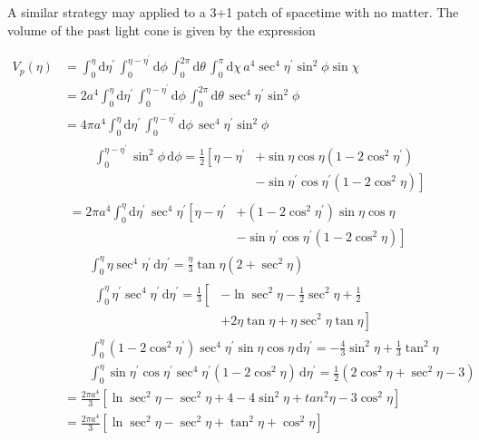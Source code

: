 \documentclass[preprint,notitlepage,amsmath,amssymb,floatfix]{revtex4-1}
\begin{document}
\noindent A similar strategy may applied to a 3+1 patch of spacetime with no matter.  The volume of the past light cone is given by the expression

\begin{align}
V_p\left(\eta\right) &= \int_0^\eta \! \mathrm d\eta^\prime \, \int_0^{\eta-\eta^\prime} \! \mathrm d\phi \, \int_0^{2\pi}\!\mathrm d\theta\, \int_0^\pi\!\mathrm d\chi\, a^4\sec^4\eta^\prime\sin^2\phi\sin\chi \\
  &= 2a^4\int_0^\eta\!\mathrm d\eta^\prime\, \int_0^{\eta-\eta^\prime}\!\mathrm d\phi\, \int_0^{2\pi}\!\mathrm d\theta\, \sec^4\eta^\prime\sin^2\phi \\
  &= 4\pi a^4 \int_0^\eta\!\mathrm d\eta^\prime\,\int_0^{\eta-\eta^\prime}\!\mathrm d\phi\, \sec^4\eta^\prime\sin^2\phi \\
  &\qquad\begin{aligned}
    \int_0^{\eta-\eta^\prime}\!\sin^2\phi\,\mathrm d\phi = \frac{1}{2}\left[\eta-\eta^\prime\right.&\left.+\sin\eta\cos\eta\left(1-2\cos^2\eta^\prime\right)\right. \\
    &\left.-\sin\eta^\prime\cos\eta^\prime\left(1-2\cos^2\eta\right)\right]
  \end{aligned} \\
  &\begin{aligned}
    = 2\pi a^4\int_0^\eta\!\mathrm d\eta^\prime\,\sec^4\eta^\prime\left[\eta-\eta^\prime\right.&\left.+\left(1-2\cos^2\eta^\prime\right)\sin\eta\cos\eta\right. \\
    &\left.-\sin\eta^\prime\cos\eta^\prime\left(1-2\cos^2\eta\right)\right]
  \end{aligned} \\
  &\qquad\int_0^\eta\!\eta\sec^4\eta^\prime\,\mathrm d\eta^\prime = \frac{\eta}{3}\tan\eta\left(2+\sec^2\eta\right) \\
  &\qquad\begin{aligned}
    \int_0^\eta\!\eta^\prime\sec^4\eta^\prime\,\mathrm d\eta^\prime = \frac{1}{3}\left[\right.&\left.-\ln\sec^2\eta-\frac{1}{2}\sec^2\eta + \frac{1}{2}\right. \\
    &\left.+2\eta\tan\eta+\eta\sec^2\eta\tan\eta\right]
  \end{aligned} \\
  &\qquad\int_0^\eta\!\left(1-2\cos^2\eta^\prime\right)\sec^4\eta^\prime\sin\eta\cos\eta\,\mathrm d\eta^\prime = -\frac{4}{3}\sin^2\eta+\frac{1}{3}\tan^2\eta \\
  &\qquad\int_0^\eta\!\sin\eta^\prime\cos\eta^\prime\sec^4\eta^\prime\left(1-2\cos^2\eta\right)\,\mathrm d\eta^\prime = \frac{1}{2}\left(2\cos^2\eta+\sec^2\eta-3\right) \\
  &= \frac{2\pi a^4}{3}\left[\ln\sec^2\eta-\sec^2\eta+4-4\sin^2\eta+tan^2\eta-3\cos^2\eta\right] \\
  &= \frac{2\pi a^4}{3}\left[\ln\sec^2\eta-\sec^2\eta+\tan^2\eta+\cos^2\eta\right]
\end{align}
\end{document}
